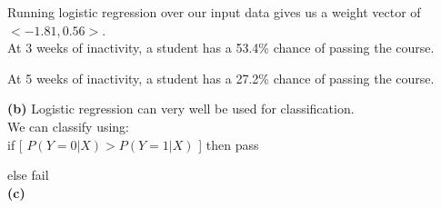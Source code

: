 \documentclass{article}
\begin{document}
Running logistic regression over our input data gives us a weight vector of $ < -1.81,  0.56 > $. \\

At 3 weeks of inactivity, a student has a 53.4\% chance of passing the course.

At 5 weeks of inactivity, a student has a 27.2\% chance of passing the course. \\

\newpage

\textbf{(b)} Logistic regression can very well be used for classification. \\
We can classify using: \\

if [ $P( Y=0 | X) > P( Y=1 | X)$ ] then pass

\hspace{1em} else fail \\

\textbf{(c)} 



\end{document}
